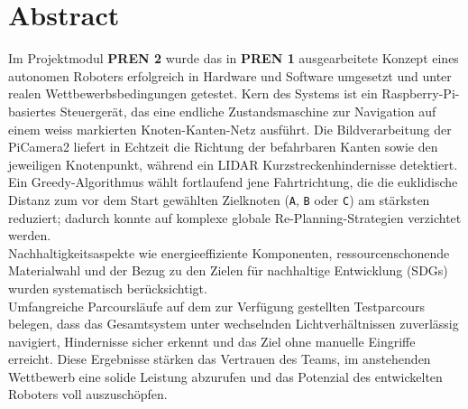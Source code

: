\documentclass[main.tex]{subfiles} %
\begin{document}
\section*{Abstract}

Im Projektmodul \textbf{PREN 2} wurde das in \textbf{PREN 1} ausgearbeitete
Konzept eines autonomen Roboters erfolgreich in Hardware und Software
umgesetzt und unter realen Wettbewerbsbedingungen getestet.
Kern des Systems ist ein Raspberry-Pi-basiertes Steuergerät, das eine
endliche Zustandsmaschine zur Navigation auf einem weiss markierten
Knoten-Kanten-Netz ausführt. Die Bildverarbeitung der PiCamera2
liefert in Echtzeit die Richtung der befahrbaren Kanten sowie den
jeweiligen Knotenpunkt, während ein LIDAR Kurzstreckenhindernisse
detektiert. Ein Greedy-Algorithmus wählt fortlaufend jene Fahrtrichtung,
die die euklidische Distanz zum vor dem Start gewählten Zielknoten
(\texttt{A}, \texttt{B} oder \texttt{C}) am stärksten reduziert; dadurch
konnte auf komplexe globale Re-Planning-Strategien verzichtet werden.\\

Nachhaltigkeitsaspekte wie energieeffiziente Komponenten, ressourcenschonende
Materialwahl und der Bezug zu den Zielen für nachhaltige Entwicklung (SDGs) wurden
systematisch berücksichtigt.\\

Umfangreiche Parcoursläufe auf dem zur Verfügung gestellten Testparcours belegen,
dass das Gesamtsystem unter wechselnden Lichtverhältnissen zuverlässig
navigiert, Hindernisse sicher erkennt und das Ziel ohne manuelle Eingriffe
erreicht. Diese Ergebnisse stärken das Vertrauen des Teams, im anstehenden
Wettbewerb eine solide Leistung abzurufen und das Potenzial des entwickelten
Roboters voll auszuschöpfen.
\end{document}

